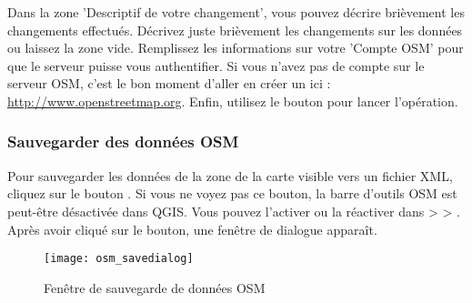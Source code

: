 Dans la zone 'Descriptif de votre changement', vous pouvez décrire brièvement les changements effectués. Décrivez juste brièvement les changements sur les données ou laissez la zone vide.
Remplissez les informations sur votre 'Compte OSM' pour que le serveur puisse vous authentifier. Si vous n'avez pas de compte sur le serveur OSM, c'est le bon moment d'aller en créer un ici : \url{http://www.openstreetmap.org}. Enfin, utilisez le bouton  pour lancer l'opération.


\subsubsection{Sauvegarder des données OSM}  

Pour sauvegarder les données de la zone de la carte visible vers un fichier XML, cliquez sur le bouton . Si vous ne voyez pas ce bouton, la barre d'outils OSM est peut-être désactivée dans QGIS. Vous pouvez l'activer ou la réactiver dans  >  > . Après avoir cliqué sur le bouton, une fenêtre de dialogue apparaît.

\begin{figure}[ht]
   \begin{center}
   \caption{Fenêtre de sauvegarde de données OSM \nixcaption}\label{fig:osmsave}\smallskip
   \texttt{[image: osm\_savedialog]}
\end{center}
\end{figure}

